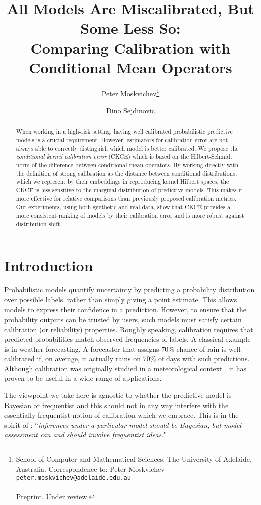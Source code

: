 \documentclass[twocolumn]{article}
\title{All Models Are Miscalibrated, But Some Less So:\\ Comparing Calibration with Conditional Mean Operators}
\date{}
\author{Peter Moskvichev\thanks{School of Computer and Mathematical Sciences, The University of Adelaide, Australia. Correspondence to: Peter Moskvichev
\texttt{peter.moskvichev@adelaide.edu.au} \\ \\ Preprint. Under review.} \and Dino Sejdinovic\footnotemark[1]}
\theoremstyle{definition}
\begin{document}
\maketitle


\begin{abstract}
    When working in a high-risk setting, having well calibrated probabilistic predictive models is a crucial requirement. However, estimators for calibration error are not always able to correctly distinguish which model is better calibrated. We propose the \emph{conditional kernel calibration error} (CKCE) which is based on the Hilbert-Schmidt norm of the difference between conditional mean operators. By working directly with the definition of strong calibration as the distance between conditional distributions, which we represent by their embeddings in reproducing kernel Hilbert spaces, the CKCE is less sensitive to the marginal distribution of predictive models. This makes it more effective for relative comparisons than previously proposed calibration metrics. Our experiments, using both synthetic and real data, show that CKCE provides a more consistent ranking of models by their calibration error and is more robust against distribution shift. 
\end{abstract}

\section{Introduction} \label{sec:intro}


Probabilistic models quantify uncertainty by predicting a probability distribution over possible labels, rather than simply giving a point estimate. This allows models to express their confidence in a prediction. However, to ensure that the probability outputs can be trusted by users, such models must satisfy certain calibration (or reliability) properties. Roughly speaking, calibration requires that predicted probabilities match observed frequencies of labels. A classical example is in weather forecasting. A forecaster that assigns 70\% chance of rain is well calibrated if, on average, it actually rains on 70\% of days with such predictions. Although calibration was originally studied in a meteorological context \citep{Brier_1950, DeGroot_1983}, it has proven to be useful in a wide range of applications. 

The viewpoint we take here is agnostic to whether the predictive model is Bayesian or frequentist and this should not in any way interfere with the essentially frequentist notion of calibration which we embrace. This is in the spirit of \citet{Little_2006}: ``\textit{inferences under a particular model should be Bayesian, but model assessment can and should involve frequentist ideas.}"
\end{document}
